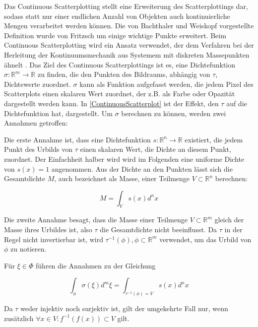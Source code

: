 \documentclass[a4paper,fontsize=12pt,toc=bib,halfparskip,ngerman]{scrartcl}
\begin{document}
Das Continuous Scatterplotting stellt eine Erweiterung des Scatterplottings dar, sodass statt nur einer endlichen Anzahl von Objekten auch kontinuierliche Mengen verarbeitet werden k\"onnen. Die von Bachthaler und Weiskopf\cite{bachthaler2008continuous} vorgestellte Definition wurde von Fritzsch\cite{fritzsch2016continuousScatterplot} um einige wichtige Punkte erweitert. Beim Continuous Scatterplotting wird ein Ansatz verwendet, der dem Verfahren bei der Herleitung der Kontinuumsmechanik aus Systemem mit diskreten Massepunkten \"ahnelt \cite[S.~1429]{bachthaler2008continuous}. Das Ziel des Continuous Scatterplottings ist es, eine Dichtefunktion $\sigma: \mathbb{R}^m \rightarrow \mathbb{R}$ zu finden, die den Punkten des Bildraums, abh\"angig von $\tau$, Dichtewerte zuordnet. $\sigma$ kann als Funktion aufgefasst werden, die jedem Pixel des Scatterplots einen skalaren Wert zuordnet, der z.B. als Farbe oder Opazit\"at dargestellt werden kann. In \cref{ContinuousScatterplot} ist der Effekt, den $\tau$ auf die Dichtefunktion hat, dargestellt. Um $\sigma$ berechnen zu k\"onnen, werden zwei Annahmen getroffen:

Die erste Annahme ist, dass eine Dichtefunktion $s: \mathbb{R}^n \rightarrow \mathbb{R}$ existiert, die jedem Punkt des Urbilds von $\tau$ einen skalaren Wert, die Dichte an diesem Punkt, zuordnet. Der Einfachheit halber wird wird im Folgenden eine uniforme Dichte von $s(x) = 1$ angenommen. Aus der Dichte an den Punkten l\"asst sich die Gesamtdichte $M$, auch bezeichnet als Masse, einer Teilmenge $V\subset\mathbb{R}^n$ berechnen:

\begin{equation}
M = \int_{V}s(x)d^nx
\label{Dichtefunktion}
\end{equation}

Die zweite Annahme besagt, dass die Masse einer Teilmenge $V\subset\mathbb{R}^m$ gleich der Masse ihres Urbildes ist, also $\tau$ die Gesamtdichte nicht beeinflusst. Da $\tau$ in der Regel nicht invertierbar ist, wird $\tau^{-1}(\phi), \phi \subset \mathbb{R}^m$ verwendet, um das Urbild von $\phi$ zu notieren. 


F\"ur $\xi \in \Phi$ f\"uhren die Annahmen zu der Gleichung

\begin{equation}
\int_{\phi}\sigma(\xi)d^m\xi = \int_{\tau^{-1}(\phi) = V}s(x)d^nx
\end{equation}

Da $\tau$ weder injektiv noch surjektiv ist, gilt der umgekehrte Fall nur, wenn zus\"atzlich $\forall x \in V: f^{-1}(f(x)) \subset V$ gilt\cite [S.~20]{fritzsch2016continuousScatterplot}.
\end{document}
